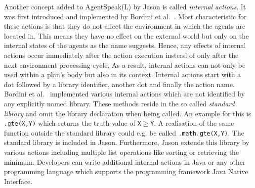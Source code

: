 Another concept added to AgentSpeak(L) by Jason is called \emph{internal actions}. It was first introduced and implemented by Bordini et al.~\cite{bordini_agentspeak_2002}. Most characteristic for these actions is that they do not affect the environment in which the agents are located in. This means they have no effect on the external world but only on the internal states of the agents as the name suggests. Hence, any effects of internal actions occur immediately after the action execution instead of only after the next environment processing cycle. As a result, internal actions can not only be used within a plan's body but also in its context. %
Internal actions start with a dot followed by a library identifier, another dot and finally the action name. Bordini et al.~\cite{bordini_agentspeak_2002} implemented various internal actions which are not identified by any explicitly named library. These methods reside in the so called \emph{standard library} and omit the library declaration when being called. An example for this is \texttt{.gte(X,Y)} which returns the truth value of \texttt{X}$\geq$\texttt{Y}. A realisation of the same function outside the standard library could e.g. be called \texttt{.math.gte(X,Y)}. The standard library is included in Jason. Furthermore, Jason extends this library by various actions including multiple list operations like sorting or retrieving the minimum. Developers can write additional internal actions in Java or any other programming language which supports the programming framework Java Native Interface. %

